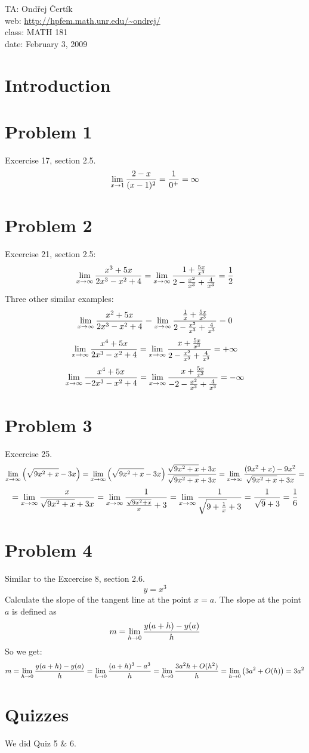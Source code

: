 \documentclass[10pt]{article}
\begin{document}
\noindent TA: Ondřej Čertík\\
web: \url{http://hpfem.math.unr.edu/~ondrej/}\\
class: MATH 181\\
date: February 3, 2009

\section{Introduction}

\section{Problem 1}

Excercise 17, section 2.5.
$$\lim_{x\to1}{2-x\over(x-1)^2} = {1\over0^{+}} = \infty$$

\section{Problem 2}

Excercise 21, section 2.5:
$$\lim_{x\to\infty} {x^3+5x\over 2x^3-x^2+4}=
\lim_{x\to\infty} {1+{5x\over x^3}\over 2-{x^2\over x^3}+{4\over x^3}}
={1\over 2}
$$
Three other similar examples:
$$\lim_{x\to\infty} {x^2+5x\over 2x^3-x^2+4}=
\lim_{x\to\infty} {{1\over x}+{5x\over x^3}\over 2-{x^2\over x^3}+{4\over x^3}}
=0
$$
$$\lim_{x\to\infty} {x^4+5x\over 2x^3-x^2+4}=
\lim_{x\to\infty} {x+{5x\over x^3}\over 2-{x^2\over x^3}+{4\over x^3}}
=+\infty
$$
$$\lim_{x\to\infty} {x^4+5x\over -2x^3-x^2+4}=
\lim_{x\to\infty} {x+{5x\over x^3}\over -2-{x^2\over x^3}+{4\over x^3}}
=-\infty
$$

\section{Problem 3}

Excercise 25.
$$\lim_{x\to\infty}\left(\sqrt{9x^2+x}-3x\right)=
\lim_{x\to\infty}\left(\sqrt{9x^2+x}-3x\right)
{\sqrt{9x^2+x}+3x\over\sqrt{9x^2+x}+3x}=
\lim_{x\to\infty}{(9x^2+x)-9x^2
\over\sqrt{9x^2+x}+3x}=
$$
$$
=
\lim_{x\to\infty}{x\over\sqrt{9x^2+x}+3x}=
\lim_{x\to\infty}{1\over{\sqrt{9x^2+x}\over x}+3}=
\lim_{x\to\infty}{1\over{\sqrt{9+{1\over x}}+3}}=
{1\over{\sqrt{9}+3}}={1\over6}
$$

\section{Problem 4}

Similar to the Excercise 8, section 2.6.
$$y=x^3$$
Calculate the slope of the tangent line at the point $x=a$.
The slope at the point $a$ is defined as
$$m = \lim_{h\to0}{y(a+h)-y(a)\over h}$$
So we get:
$$m = \lim_{h\to0}{y(a+h)-y(a)\over h}=
\lim_{h\to0}{(a+h)^3-a^3\over h}=
\lim_{h\to0}{3a^2h +O(h^2)\over h}=
\lim_{h\to0}\left({3a^2 +O(h)}\right)=3a^2
$$

\section{Quizzes}

We did Quiz 5 \& 6.
\end{document}
